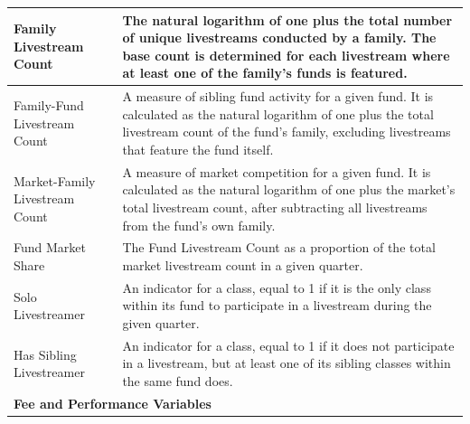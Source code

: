 \begin{longtable}{lp{}}
    \midrule
    Family Livestream Count        & The natural logarithm of one plus the total number of unique livestreams conducted by a family. The base count is determined for each livestream where at least one of the family's funds is featured.                                                                                                            \\
    \midrule
    Family-Fund Livestream Count   & A measure of sibling fund activity for a given fund. It is calculated as the natural logarithm of one plus the total livestream count of the fund's family, excluding livestreams that feature the fund itself.                                                                                                   \\
    \midrule
    Market-Family Livestream Count & A measure of market competition for a given fund. It is calculated as the natural logarithm of one plus the market's total livestream count, after subtracting all livestreams from the fund's own family.                                                                                                        \\
    \midrule
    Fund Market Share              & The Fund Livestream Count as a proportion of the total market livestream count in a given quarter.                                                                                                                                                                                                                \\
    \midrule
    Solo Livestreamer              & An indicator for a class, equal to 1 if it is the only class within its fund to participate in a livestream during the given quarter.                                                                                                                                                                             \\
    \midrule
    Has Sibling Livestreamer       & An indicator for a class, equal to 1 if it does not participate in a livestream, but at least one of its sibling classes within the same fund does.                                                                                                                                                               \\
    \midrule
    \multicolumn{2}{l}{\textbf{Fee and Performance Variables}}                                                                                                                                                                                                                                                                                       \\

\end{longtable}
